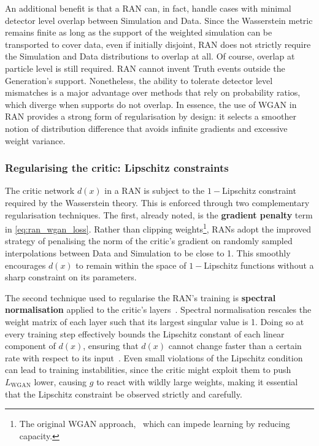 {{            An additional benefit is that a RAN can, in fact, handle cases with minimal detector level overlap between Simulation and Data.
            Since the Wasserstein metric remains finite as long as the support of the weighted simulation can be transported to cover data, even if initially disjoint, RAN does not strictly require the Simulation and Data distributions to overlap at all.
            Of course, overlap at particle level is still required.
            RAN cannot invent Truth events outside the Generation’s support.
            Nonetheless, the ability to tolerate detector level mismatches is a major advantage over methods that rely on probability ratios, which diverge when supports do not overlap.
            In essence, the use of WGAN in RAN provides a strong form of regularisation by design: it selects a smoother notion of distribution difference that avoids infinite gradients and excessive weight variance.
            
        \subsubsection{Regularising the critic: Lipschitz constraints}
        
            The critic network $d(x)$ in a RAN is subject to the \(1-\)Lipschitz constraint required by the Wasserstein theory.
            This  is enforced through two complementary regularisation techniques.
            The first, already noted, is the \textbf{gradient penalty} term in \cref{eq:ran_wgan_loss}.
            Rather than clipping weights\footnote{The original WGAN approach,~\cite{arjovsky_wasserstein_2017} which can impede learning by reducing capacity.}, RANs adopt the improved strategy of penalising the norm of the critic’s gradient on randomly sampled interpolations between Data and Simulation to be close to 1.
            This smoothly encourages $d(x)$ to remain within the space of \(1-\)Lipschitz functions without a sharp constraint on its parameters.
            
            The second technique used to regularise the RAN's training is \textbf{spectral normalisation} applied to the critic’s layers~\cite{miyato_spectral_2018}.
            Spectral normalisation rescales the weight matrix of each layer such that its largest singular value is 1.
            Doing so at every training step effectively bounds the Lipschitz constant of each linear component of $d(x)$, ensuring that $d(x)$ cannot change faster than a certain rate with respect to its input~\cite{scaman_lipschitz_2019, Terjek2019AdversarialRegularization, delattre_efficient_2023, mehta_effects_2023, meunier_dynamical_2022}.
            Even small violations of the Lipschitz condition can lead to training instabilities, since the critic might exploit them to push $L_{\text{WGAN}}$ lower, causing $g$ to react with wildly large weights, making it essential that the Lipschitz constraint be observed strictly and carefully.
            
}}
